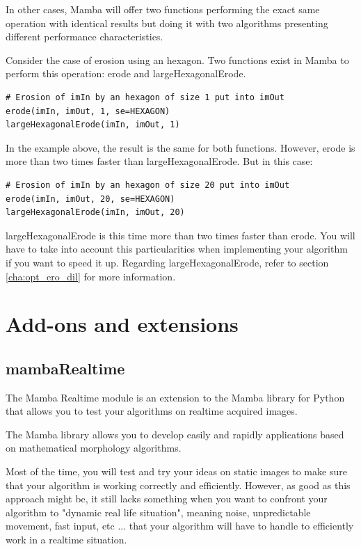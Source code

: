 \documentclass[a4paper,10pt,oneside]{article}
\begin{document}
In other cases, Mamba will offer two functions performing the exact same 
operation with identical results but doing it with two algorithms presenting
different performance characteristics.

Consider the case of erosion using an hexagon. Two functions exist in Mamba to
perform this operation: erode and largeHexagonalErode.

\lstset{language=Python}
\begin{lstlisting}
# Erosion of imIn by an hexagon of size 1 put into imOut
erode(imIn, imOut, 1, se=HEXAGON)
largeHexagonalErode(imIn, imOut, 1)
\end{lstlisting}

In the example above, the result is the same for both functions. However, erode is
more than two times faster than largeHexagonalErode. But in this case:

\lstset{language=Python}
\begin{lstlisting}
# Erosion of imIn by an hexagon of size 20 put into imOut
erode(imIn, imOut, 20, se=HEXAGON)
largeHexagonalErode(imIn, imOut, 20)
\end{lstlisting}

largeHexagonalErode is this time more than two times faster than erode. You will
have to take into account this particularities when implementing your algorithm
if you want to speed it up. Regarding largeHexagonalErode, refer to section 
\ref{cha:opt_ero_dil} for more information.


\pagebreak

\section{Add-ons and extensions}
\subsection{mambaRealtime}

The Mamba Realtime module is an extension to the Mamba library for Python that 
allows you to test your algorithms on realtime acquired images.

The Mamba library allows you to develop easily and rapidly applications based on 
mathematical morphology algorithms. 

Most of the time, you will test and try your ideas on static images to make sure 
that your algorithm is working correctly and efficiently. However, as good as 
this approach might be, it still lacks something when you want to confront your 
algorithm to "dynamic real life situation", meaning noise, unpredictable 
movement, fast input, etc ... that your algorithm will have to handle to 
efficiently work in a realtime situation.
\end{document}
